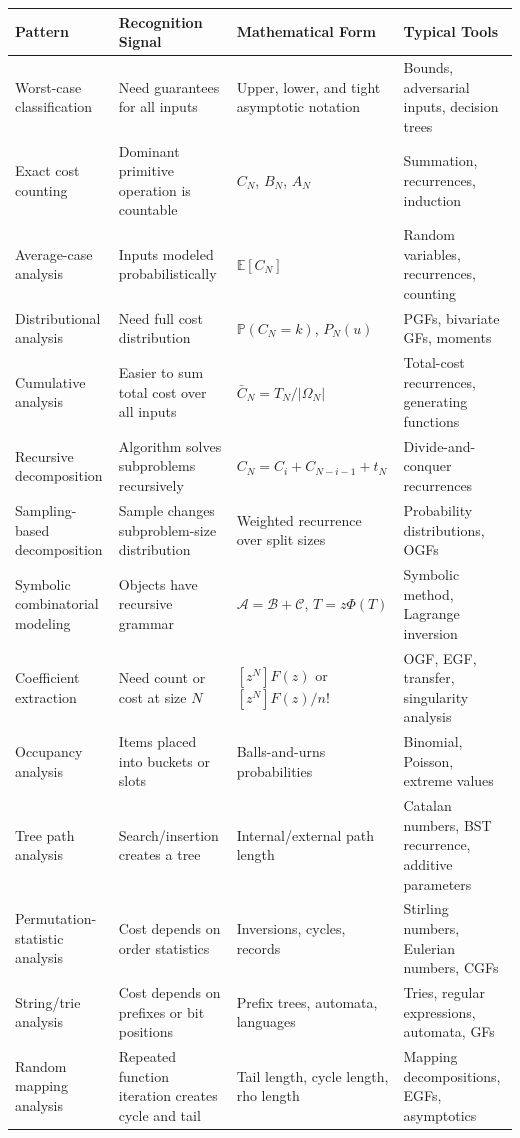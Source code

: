 \documentclass[11pt]{article}
\newcommand{\E}{\mathbb{E}}
\newcommand{\Prob}{\mathbb{P}}
\begin{document}
\begin{longtable}{L{0.20\textwidth} L{0.23\textwidth} L{0.23\textwidth} L{0.20\textwidth}}
\toprule
\textbf{Pattern} & \textbf{Recognition Signal} & \textbf{Mathematical Form} & \textbf{Typical Tools} \\
\midrule
\endhead
Worst-case classification & Need guarantees for all inputs & Upper, lower, and tight asymptotic notation & Bounds, adversarial inputs, decision trees \\
Exact cost counting & Dominant primitive operation is countable & \(C_N\), \(B_N\), \(A_N\) & Summation, recurrences, induction \\
Average-case analysis & Inputs modeled probabilistically & \(\E[C_N]\) & Random variables, recurrences, counting \\
Distributional analysis & Need full cost distribution & \(\Prob(C_N=k)\), \(P_N(u)\) & PGFs, bivariate GFs, moments \\
Cumulative analysis & Easier to sum total cost over all inputs & \(\bar C_N=T_N/|\Omega_N|\) & Total-cost recurrences, generating functions \\
Recursive decomposition & Algorithm solves subproblems recursively & \(C_N=C_i+C_{N-i-1}+t_N\) & Divide-and-conquer recurrences \\
Sampling-based decomposition & Sample changes subproblem-size distribution & Weighted recurrence over split sizes & Probability distributions, OGFs \\
Symbolic combinatorial modeling & Objects have recursive grammar & \(\mathcal A=\mathcal B+\mathcal C\), \(T=z\Phi(T)\) & Symbolic method, Lagrange inversion \\
Coefficient extraction & Need count or cost at size \(N\) & \([z^N]F(z)\) or \([z^N]F(z)/n!\) & OGF, EGF, transfer, singularity analysis \\
Occupancy analysis & Items placed into buckets or slots & Balls-and-urns probabilities & Binomial, Poisson, extreme values \\
Tree path analysis & Search/insertion creates a tree & Internal/external path length & Catalan numbers, BST recurrence, additive parameters \\
Permutation-statistic analysis & Cost depends on order statistics & Inversions, cycles, records & Stirling numbers, Eulerian numbers, CGFs \\
String/trie analysis & Cost depends on prefixes or bit positions & Prefix trees, automata, languages & Tries, regular expressions, automata, GFs \\
Random mapping analysis & Repeated function iteration creates cycle and tail & Tail length, cycle length, rho length & Mapping decompositions, EGFs, asymptotics \\
\bottomrule
\end{longtable}
\end{document}
